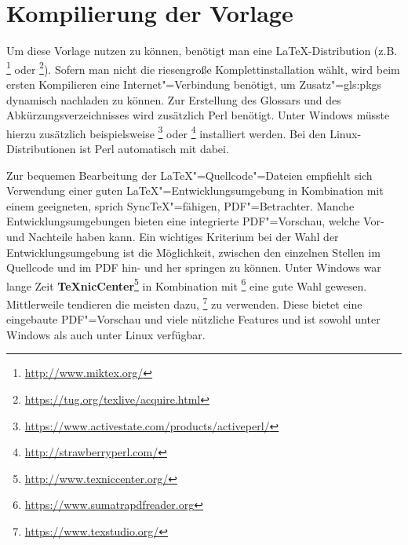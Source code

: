 \section{Kompilierung der Vorlage}%
\label{sec:Kompilierung}
%
Um diese Vorlage nutzen zu können, benötigt man eine \LaTeX-Distribution (z.B. \footnote{\url{http://www.miktex.org/}} oder \footnote{\url{https://tug.org/texlive/acquire.html}}).
Sofern man nicht die riesengroße Komplettinstallation wählt, wird beim ersten Kompilieren eine Internet"=Verbindung benötigt, um Zusatz"=\glspl{gls:pkg} dynamisch nachladen zu können.
Zur Erstellung des Glossars und des Abkürzungsverzeichnisses wird zusätzlich Perl benötigt.
Unter Windows müsste hierzu zusätzlich beispielsweise \footnote{\url{https://www.activestate.com/products/activeperl/}}
oder \footnote{\url{http://strawberryperl.com/}} installiert werden.
Bei den Linux-Distributionen ist Perl automatisch mit dabei.

Zur bequemen Bearbeitung der \LaTeX"=Quellcode"=Dateien empfiehlt sich Verwendung einer guten \LaTeX"=Entwicklungsumgebung in Kombination mit einem geeigneten, sprich SyncTeX"=fähigen, PDF"=Betrachter.
Manche Entwicklungsumgebungen bieten eine integrierte PDF"=Vorschau, welche Vor- und Nachteile haben kann.
Ein wichtiges Kriterium bei der Wahl der Entwicklungsumgebung ist die Möglichkeit, zwischen den einzelnen Stellen im Quellcode und im PDF hin- und her springen zu können.
Unter Windows war lange Zeit \textbf{TeXnicCenter}\footnote{\url{http://www.texniccenter.org/}} in Kombination mit \footnote{\url{https://www.sumatrapdfreader.org}} eine gute Wahl gewesen.
Mittlerweile tendieren die meisten dazu, \footnote{\url{https://www.texstudio.org/}} zu verwenden.
Diese bietet eine eingebaute PDF"=Vorschau und viele nützliche Features und ist sowohl unter Windows als auch unter Linux verfügbar.

